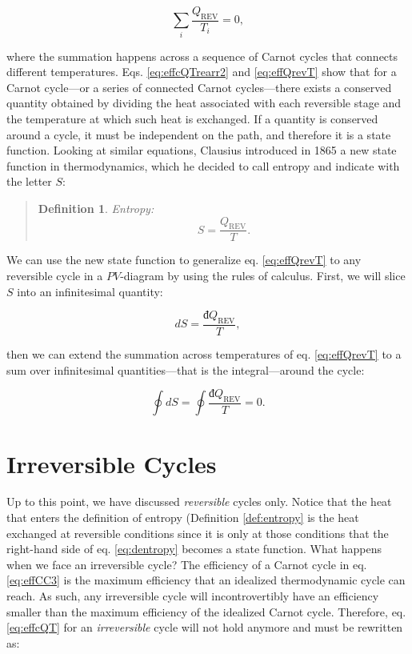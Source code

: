 \documentclass[
  9pt,
]{extbook}
\theoremstyle{definition}
\newtheorem{definition}{Definition}[chapter]
\theoremstyle{definition}
\theoremstyle{definition}
\theoremstyle{remark}
\begin{document}
\begin{equation}
\sum_i \frac{Q_{\mathrm{REV}}}{T_i} = 0,
\label{eq:effQrevT}
\end{equation}

where the summation happens across a sequence of Carnot cycles that connects different temperatures. Eqs. \eqref{eq:effcQTrearr2} and \eqref{eq:effQrevT} show that for a Carnot cycle---or a series of connected Carnot cycles---there exists a conserved quantity obtained by dividing the heat associated with each reversible stage and the temperature at which such heat is exchanged. If a quantity is conserved around a cycle, it must be independent on the path, and therefore it is a state function. Looking at similar equations, Clausius introduced in 1865 a new state function in thermodynamics, which he decided to call entropy and indicate with the letter \(S\):

\begin{quote}
\begin{definition}
\protect\hypertarget{def:entropy}{}{\label{def:entropy} }\emph{Entropy:} \begin{equation}
S = \frac{Q_{\mathrm{REV}}}{T}.
\end{equation}
\end{definition}
\end{quote}

We can use the new state function to generalize eq. \eqref{eq:effQrevT} to any reversible cycle in a \(PV\)-diagram by using the rules of calculus. First, we will slice \(S\) into an infinitesimal quantity:

\begin{equation}
dS = \frac{đQ_{\mathrm{REV}}}{T},
\label{eq:dentropy}
\end{equation}

then we can extend the summation across temperatures of eq. \eqref{eq:effQrevT} to a sum over infinitesimal quantities---that is the integral---around the cycle:

\begin{equation}
\oint dS = \oint \frac{đQ_{\mathrm{REV}}}{T} = 0.
\label{eq:ds0}
\end{equation}

\hypertarget{irreversible-cycles}{%
\section{Irreversible Cycles}\label{irreversible-cycles}}

Up to this point, we have discussed \emph{reversible} cycles only. Notice that the heat that enters the definition of entropy (Definition \ref{def:entropy} is the heat exchanged at reversible conditions since it is only at those conditions that the right-hand side of eq. \eqref{eq:dentropy} becomes a state function. What happens when we face an irreversible cycle? The efficiency of a Carnot cycle in eq. \eqref{eq:effCC3} is the maximum efficiency that an idealized thermodynamic cycle can reach. As such, any irreversible cycle will incontrovertibly have an efficiency smaller than the maximum efficiency of the idealized Carnot cycle. Therefore, eq. \eqref{eq:effcQT} for an \emph{irreversible} cycle will not hold anymore and must be rewritten as:
\end{document}
